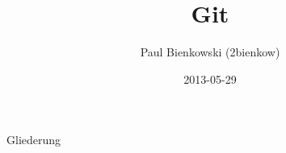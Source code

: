 \documentclass[compress,t,usenames,dvipsnames]{beamer}
\title{Git}
\author{Paul Bienkowski (2bienkow)}
\institute{KunterBuntesSeminar}
\date{2013-05-29}
\begin{document}
\frame{
    \titlepage
}

\begin{frame}{Gliederung}
    \tableofcontents
\end{frame}






\end{document}
